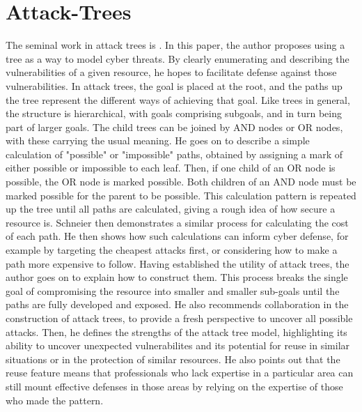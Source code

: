 \section{Attack-Trees}
The seminal work in attack trees is \cite{Schneier1999}. In this paper, the author proposes using a tree as a way to model cyber threats. By clearly enumerating and describing the vulnerabilities of a given resource, he hopes to facilitate defense against those vulnerabilities. In attack trees, the goal is placed at the root, and the paths up the tree represent the different ways of achieving that goal. Like trees in general, the structure is hierarchical, with goals comprising subgoals, and in turn being part of larger goals. The child trees can be joined by AND nodes or OR nodes, with these carrying the usual meaning. He goes on to describe a simple calculation of "possible" or "impossible" paths, obtained by assigning a mark of either possible or impossible to each leaf. Then, if one child of an OR node is possible, the OR node is marked possible. Both children of an AND node must be marked possible for the parent to be possible. This calculation pattern is repeated up the tree until all paths are calculated, giving a rough idea of how secure a resource is. Schneier then demonstrates a similar process for calculating the cost of each path. He then shows how such calculations can inform cyber defense, for example by targeting the cheapest attacks first, or considering how to make a path more expensive to follow. Having established the utility of attack trees, the author goes on to explain how to construct them. This process breaks the single goal of compromising the resource into smaller and smaller sub-goals until the paths are fully developed and exposed. He also recommends collaboration in the construction of attack trees, to provide a fresh perspective to uncover all possible attacks. Then, he defines the strengths of the attack tree model, highlighting its ability to uncover unexpected vulnerabilites and its potential for reuse in similar situations or in the protection of similar resources. He also points out that the reuse feature means that professionals who lack expertise in a particular area can still mount effective defenses in those areas by relying on the expertise of those who made the pattern. 

